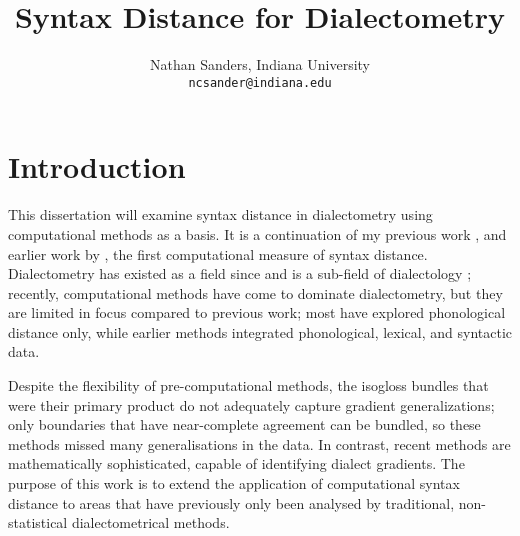 \documentclass[11pt]{article}
\author{Nathan Sanders, Indiana University \\ \tt{ncsander@indiana.edu}}
\title{Syntax Distance for Dialectometry}
\begin{document}
\maketitle


\section{Introduction}




This dissertation will examine syntax distance in dialectometry using
computational methods as a basis. It is a continuation of my previous
work \cite{sanders07}, \cite{sanders08b} and earlier work by
, the first computational measure of syntax
distance. Dialectometry has existed as a field since
 and is a sub-field of dialectology
\cite{chambers92}; recently, computational methods have come to
dominate dialectometry, but they are limited in focus compared to
previous work; most have explored phonological distance only, while
earlier methods integrated phonological, lexical, and syntactic data.

Despite the flexibility of pre-computational methods, the isogloss
bundles that were their primary product do not adequately capture gradient
generalizations; only boundaries that have near-complete agreement can
be bundled, so these methods missed many generalisations in the data.
In contrast, recent methods are mathematically
sophisticated, capable of identifying dialect gradients. The purpose
of this work is to extend the application of computational syntax
distance to areas that have previously only been analysed by
traditional, non-statistical dialectometrical methods.
\end{document}
